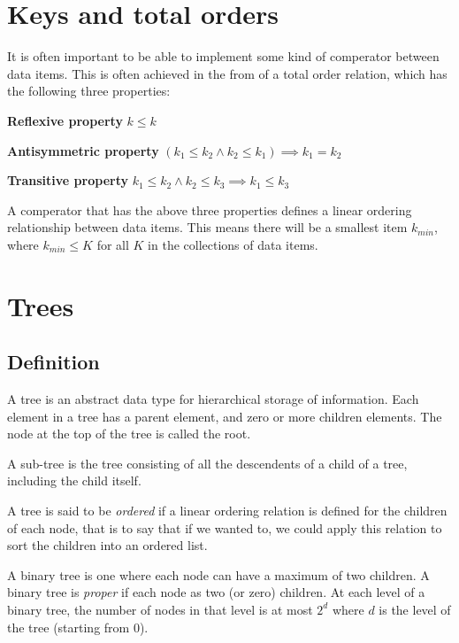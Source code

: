 
\section{Keys and total orders}

It is often important to be able to implement some kind of comperator between
data items. This is often achieved in the from of a total order relation, which
has the following three properties:

\begin{description}
  \item \textbf{Reflexive property} 
    $k \leq k$
  \item \textbf{Antisymmetric property}
    $(k_1 \leq k_2 \wedge k_2 \leq k_1) \implies k_1 = k_2$
  \item \textbf{Transitive property} 
    $k_1 \leq k_2 \wedge k_2 \leq k_3 \implies k_1 \leq k_3$
\end{description}

A comperator that has the above three properties defines a linear ordering
relationship between data items. This means there will be a smallest item
$k_{min}$, where $k_{min} \leq K$ for all $K$ in the collections of data items.

\section{Trees}

\subsection{Definition}

A tree is an abstract data type for hierarchical storage of information. Each
element in a tree has a parent element, and zero or more children elements. The
node at the top of the tree is called the root.

A sub-tree is the tree consisting of all the descendents of a child of a tree,
including the child itself.

A tree is said to be \textit{ordered} if a linear ordering relation is defined
for the children of each node, that is to say that if we wanted to, we could
apply this relation to sort the children into an ordered list.

A binary tree is one where each node can have a maximum of two children. A
binary tree is \textit{proper} if each node as two (or zero) children. At each
level of a binary tree, the number of nodes in that level is at most $2^d$ where
$d$ is the level of the tree (starting from 0).

